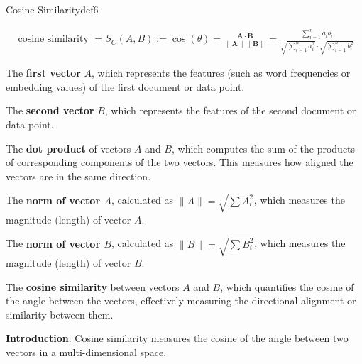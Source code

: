 \documentclass[
  12 pt,
  a4paper,
]{book}
\numberwithin{equation}{section}
\theoremstyle{plain}      %
\theoremstyle{definition} %
\theoremstyle{remark}     %
\theoremstyle{note}         %
\begin{document}
\vspace*{\fill}
\begin{a_def_eq}{Cosine Similarity}{def6} 

\begin{align}\label{cosine_sim_full}
\text { cosine similarity }=S_C(A, B):=\cos (\theta)=\frac{\mathbf{A} \cdot \mathbf{B}}{\|\mathbf{A}\|\|\mathbf{B}\|}=\frac{\sum_{i=1}^n a_i b_i}{\sqrt{\sum_{i=1}^n a_i^2} \cdot \sqrt{\sum_{i=1}^n b_i^2}}
\end{align}

\begin{description}[align=left, labelwidth=2.2cm, labelsep=0em, leftmargin=2.2cm] 
    \item[$A$] The \textbf{first vector} \( A \), which represents the features (such as word frequencies or embedding values) of the first document or data point. 
    \vspace{0.5\baselineskip}
    \item[$B$] The \textbf{second vector} \( B \), which represents the features of the second document or data point. 
    \vspace{0.5\baselineskip}
    \item[$A \cdot B$] The \textbf{dot product} of vectors \( A \) and \( B \), which computes the sum of the products of corresponding components of the two vectors. This measures how aligned the vectors are in the same direction.
    \vspace{0.5\baselineskip}
    \item[$\|A\|$] The \textbf{norm of vector \( A \)}, calculated as \( \|A\| = \sqrt{\sum A_i^2} \), which measures the magnitude (length) of vector \( A \).
    \vspace{0.5\baselineskip}
    \item[$\|B\|$] The \textbf{norm of vector \( B \)}, calculated as \( \|B\| = \sqrt{\sum B_i^2} \), which measures the magnitude (length) of vector \( B \).
    \vspace{0.5\baselineskip}
    \item[$\text{similarity}$] The \textbf{cosine similarity} between vectors \( A \) and \( B \), which quantifies the cosine of the angle between the vectors, effectively measuring the directional alignment or similarity between them.
\end{description}

\end{a_def_eq}

\hfill\break

\textbf{Introduction}: Cosine similarity measures the cosine of the
angle between two vectors in a multi-dimensional space.
\end{document}
